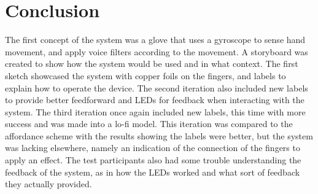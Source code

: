\section{Conclusion}

The first concept of the system was a glove that uses a gyroscope to sense hand movement, and apply voice filters according to the movement. A storyboard was created to show how the system would be used and in what context. The first sketch showcased the system with copper foils on the fingers, and labels to explain how to operate the device. The second iteration also included new labels to provide better feedforward and LEDs for feedback when interacting with the system. The third iteration once again included new labels, this time with more success and was made into a lo-fi model. This iteration was compared to the affordance scheme with the results showing the labels were better, but the system was lacking elsewhere, namely an indication of the connection of the fingers to apply an effect. The test participants also had some trouble understanding the feedback of the system, as in how the LEDs worked and what sort of feedback they actually provided.